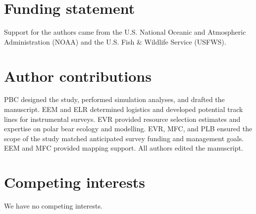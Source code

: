 \documentclass[]{rsos}%
\begin{document}
\section*{Funding statement}  Support for the authors came from the U.S. National Oceanic and Atmospheric Administration (NOAA) and the U.S. Fish \& Wildlife Service (USFWS).

\section*{Author contributions}  PBC designed the study, performed simulation analyses, and drafted the manuscript.  EEM and ELR determined logistics and developed potential track lines for instrumental surveys. EVR provided resource selection estimates and expertise on polar bear ecology and modelling. EVR, MFC, and PLB ensured the scope of the study matched anticipated survey funding and management goals. EEM and MFC provided mapping support. All authors edited the manuscript.

\section*{Competing interests} We have no competing interests.
\end{document}
